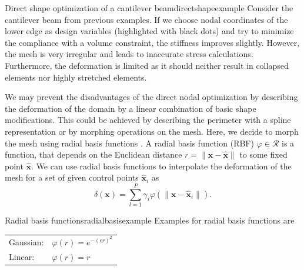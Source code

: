 \begin{example}{Direct shape optimization of a cantilever beam}{directshapeexample}   
    Consider the cantilever beam from previous examples. If we choose nodal coordinates of the lower edge as design variables (highlighted with black dots) and try to minimize the compliance with a volume constraint, the stiffness improves slightly. However, the mesh is very irregular and leads to inaccurate stress calculations. Furthermore, the deformation is limited as it should neither result in collapsed elements nor highly stretched elements. 
    \begin{center}
        
    \end{center}
\end{example}

We may prevent the disadvantages of the direct nodal optimization by describing the deformation of the domain by a linear combination of basic shape modifications. This could be achieved by describing the perimeter with a spline representation \cite{Christensen2008} or by morphing operations on the mesh. Here, we decide to morph the mesh using radial basis functions \cite{Biancolini20}. 
A radial basis function (RBF) $\varphi \in \mathcal{R}$ is a function, that depends on the Euclidean distance $r = \lVert \mathbf{x}-\hat{\mathbf{x}} \rVert$ to some fixed point $\hat{\mathbf{x}}$.
We can use radial basis functions to interpolate the deformation of the mesh for a set of given control points $\hat{\mathbf{x}}_i$ as 
\begin{equation}
    \delta(\mathbf{x}) = \sum_{l=1}^P \gamma_i \varphi(\lVert \mathbf{x}-\hat{\mathbf{x}}_i \rVert).
\end{equation}

\begin{example}{Radial basis functions}{radialbasisexample}   
    Examples for radial basis functions are
    \begin{center}
        \begin{tabular}{ll}
            Gaussian: & $\varphi(r) = e^{-(\epsilon r)^2}$ \\
            Linear: & $\varphi(r) = r$ \\
        \end{tabular}
    \end{center}
\end{example}


